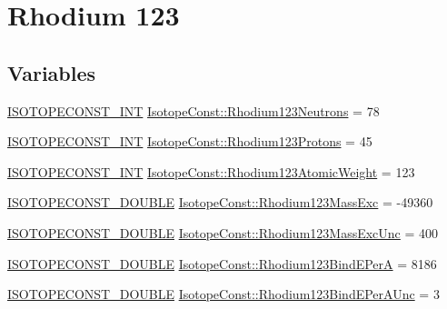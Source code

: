 \hypertarget{group___isotope_const-_rhodium-_rh123}{}\section{Rhodium 123}
\label{group___isotope_const-_rhodium-_rh123}
\subsection*{Variables}
\begin{DoxyCompactItemize}
\item 
\mbox{\hyperlink{group___isotope_const-_macros_ga5f18360b3e99483a35c32d789e62621c}{I\+S\+O\+T\+O\+P\+E\+C\+O\+N\+S\+T\+\_\+\+I\+NT}} \mbox{\hyperlink{group___isotope_const-_rhodium-_rh123_gad272a65dbec42503eeda4eb275d8088b}{Isotope\+Const\+::\+Rhodium123\+Neutrons}} = 78
\item 
\mbox{\hyperlink{group___isotope_const-_macros_ga5f18360b3e99483a35c32d789e62621c}{I\+S\+O\+T\+O\+P\+E\+C\+O\+N\+S\+T\+\_\+\+I\+NT}} \mbox{\hyperlink{group___isotope_const-_rhodium-_rh123_gab7e23c22405e99fd9cd141984554e6dd}{Isotope\+Const\+::\+Rhodium123\+Protons}} = 45
\item 
\mbox{\hyperlink{group___isotope_const-_macros_ga5f18360b3e99483a35c32d789e62621c}{I\+S\+O\+T\+O\+P\+E\+C\+O\+N\+S\+T\+\_\+\+I\+NT}} \mbox{\hyperlink{group___isotope_const-_rhodium-_rh123_ga328d3cf89ef2f8989aa77610c0bb67ed}{Isotope\+Const\+::\+Rhodium123\+Atomic\+Weight}} = 123
\item 
\mbox{\hyperlink{group___isotope_const-_macros_ga8f45a7272ce02c0b4c65c44636ed719a}{I\+S\+O\+T\+O\+P\+E\+C\+O\+N\+S\+T\+\_\+\+D\+O\+U\+B\+LE}} \mbox{\hyperlink{group___isotope_const-_rhodium-_rh123_ga9970bc8d61b5068c945abb4ef4410355}{Isotope\+Const\+::\+Rhodium123\+Mass\+Exc}} = -\/49360
\item 
\mbox{\hyperlink{group___isotope_const-_macros_ga8f45a7272ce02c0b4c65c44636ed719a}{I\+S\+O\+T\+O\+P\+E\+C\+O\+N\+S\+T\+\_\+\+D\+O\+U\+B\+LE}} \mbox{\hyperlink{group___isotope_const-_rhodium-_rh123_ga0756fde227c5a4c0d30be16c80f52f12}{Isotope\+Const\+::\+Rhodium123\+Mass\+Exc\+Unc}} = 400
\item 
\mbox{\hyperlink{group___isotope_const-_macros_ga8f45a7272ce02c0b4c65c44636ed719a}{I\+S\+O\+T\+O\+P\+E\+C\+O\+N\+S\+T\+\_\+\+D\+O\+U\+B\+LE}} \mbox{\hyperlink{group___isotope_const-_rhodium-_rh123_ga945fa79bc54914e85cd85917bf86891a}{Isotope\+Const\+::\+Rhodium123\+Bind\+E\+PerA}} = 8186
\item 
\mbox{\hyperlink{group___isotope_const-_macros_ga8f45a7272ce02c0b4c65c44636ed719a}{I\+S\+O\+T\+O\+P\+E\+C\+O\+N\+S\+T\+\_\+\+D\+O\+U\+B\+LE}} \mbox{\hyperlink{group___isotope_const-_rhodium-_rh123_ga1340bd94a4b2c673454e1b3655c174c3}{Isotope\+Const\+::\+Rhodium123\+Bind\+E\+Per\+A\+Unc}} = 3

\end{DoxyCompactItemize}
